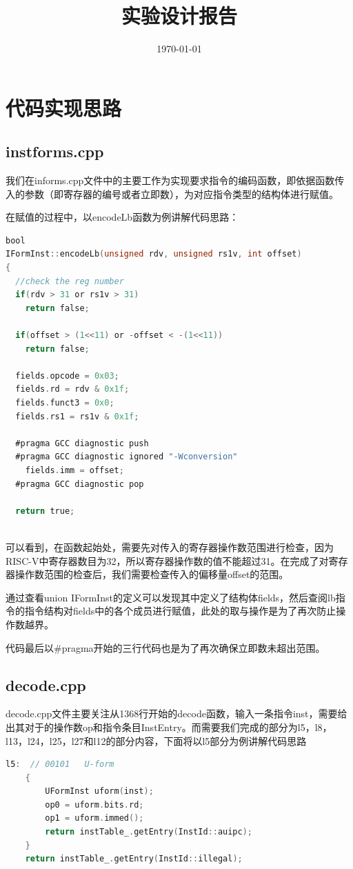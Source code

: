 \documentclass{../source/zjureport}
\title{实验设计报告}
\date{\today}
\begin{document}
    \makecover
    \makeheader

    \section{代码实现思路}
        \subsection{instforms.cpp}
            我们在informs.cpp文件中的主要工作为实现要求指令的编码函数，即依据函数传入的参数（即寄存器的编号或者立即数），为对应指令类型的结构体进行赋值。

            在赋值的过程中，以encodeLb函数为例讲解代码思路：
            \begin{lstlisting}[language = C , caption = decodeLb]
bool
IFormInst::encodeLb(unsigned rdv, unsigned rs1v, int offset)
{
  //check the reg number
  if(rdv > 31 or rs1v > 31)
    return false;

  if(offset > (1<<11) or -offset < -(1<<11))
    return false;

  fields.opcode = 0x03;
  fields.rd = rdv & 0x1f;
  fields.funct3 = 0x0;
  fields.rs1 = rs1v & 0x1f;

  #pragma GCC diagnostic push
  #pragma GCC diagnostic ignored "-Wconversion"
    fields.imm = offset;
  #pragma GCC diagnostic pop

  return true;
              
            \end{lstlisting}

            可以看到，在函数起始处，需要先对传入的寄存器操作数范围进行检查，因为RISC-V中寄存器数目为32，所以寄存器操作数的值不能超过31。在完成了对寄存器操作数范围的检查后，我们需要检查传入的偏移量offset的范围。

            通过查看union IFormInst的定义可以发现其中定义了结构体fields，然后查阅lb指令的指令结构对fields中的各个成员进行赋值，此处的取与操作是为了再次防止操作数越界。

            代码最后以\#pragma开始的三行代码也是为了再次确保立即数未超出范围。

            \subsection{decode.cpp}
            decode.cpp文件主要关注从1368行开始的decode函数，输入一条指令inst，需要给出其对于的操作数op和指令条目InstEntry。而需要我们完成的部分为l5，l8，l13，l24，l25，l27和l12的部分内容，下面将以l5部分为例讲解代码思路
\begin{lstlisting}[language = C , caption = l5部分]
l5:  // 00101   U-form
    {
        UFormInst uform(inst);
        op0 = uform.bits.rd;
        op1 = uform.immed();
        return instTable_.getEntry(InstId::auipc);
    }
    return instTable_.getEntry(InstId::illegal);
\end{lstlisting}
\end{document}
